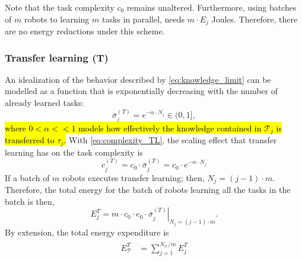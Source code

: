 Note that the task complexity $c_0$ remains unaltered. Furthermore, using batches of $m$ robots to learning $m$ tasks in parallel, needs $m\cdot E_j$ \unit[]{Joules}. Therefore, there are no energy reductions under this scheme.

\subsubsection{Transfer learning (T)}
An idealization of the behavior described by \eqref{eq:knowledge_limit} can be modelled as a function that is exponentially decreasing with the number of already learned tasks:
\begin{equation}
  \bar{\sigma}^{(T)}_j = e^{-\alpha  \cdot N_{j}} \in (0,1],
\end{equation}
\hl{where $ 0<\alpha<<1$ models how effectively the knowledge contained in $\mathcal{T}_j$ is transferred to $\tau_j$.} With \eqref{eq:complexity_TL}, the scaling effect that transfer learning has on the task complexity is
\begin{equation}\label{eq:complexity_TL}
  c^{(T)}_j = c_0 \cdot \bar{\sigma}^{(T)}_j = c_0 \cdot e^{-\alpha \cdot N_{j}}
\end{equation}
If a batch of $m$ robots executes transfer learning; then, $ N_{j} = (j-1) \cdot m$. Therefore, the total energy for the batch of robots learning all the tasks in the batch is then,
\begin{equation}
  E^{T}_j =    m \cdot c_0 \cdot e_0 \cdot \left.\bar{\sigma}^{(T)}_j \right\vert_{N_j = (j-1)\cdot m}.
\end{equation}
By extension, the total energy expenditure is
\begin{align}\label{eq:itl_total_energy}
\begin{split}
  E^{T}_{\mathcal{T}} &= \sum^{{N_{\mathcal{T}}}/{m}}_{j=1} E^{T}_j \\
\end{split}
\end{align}

